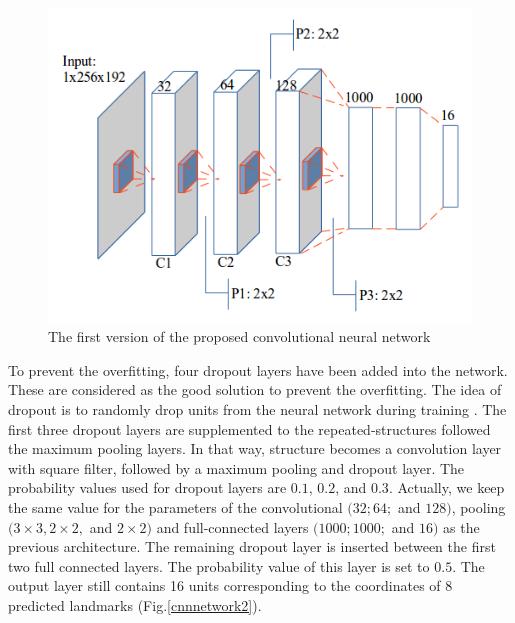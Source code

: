 \documentclass[10pt]{article}
\begin{document}
\begin{figure}[htbp]
\centering
\includegraphics[scale=0.4]{images/architecture1}
\caption{The first version of the proposed convolutional neural network} 
\label{cnnnetwork1}
\end{figure}


To prevent the overfitting, four dropout layers have been added into the network. These are considered as the good solution to prevent the overfitting. The idea of dropout is to randomly drop units from the neural network during training \cite{srivastava2014dropout}. The first three dropout layers are supplemented to the repeated-structures followed the maximum pooling layers. In that way, structure becomes a convolution layer with square filter, followed by a maximum pooling and dropout layer. The probability values used for dropout layers are $0.1$, $0.2$, and $0.3$. Actually, we keep the same value for the parameters of the convolutional $(32; 64;$ and $128)$, pooling $(3 \times 3, 2 \times 2,$ and $2 \times 2)$ and full-connected layers $(1000; 1000;$ and $16)$ as the previous architecture. 
The remaining dropout layer is inserted between the first
two full connected layers. The probability value of this layer
is set to $0.5$. The output layer still contains 16 units corresponding to the coordinates of 8 predicted landmarks (Fig.\ref{cnnnetwork2}).
\end{document}
